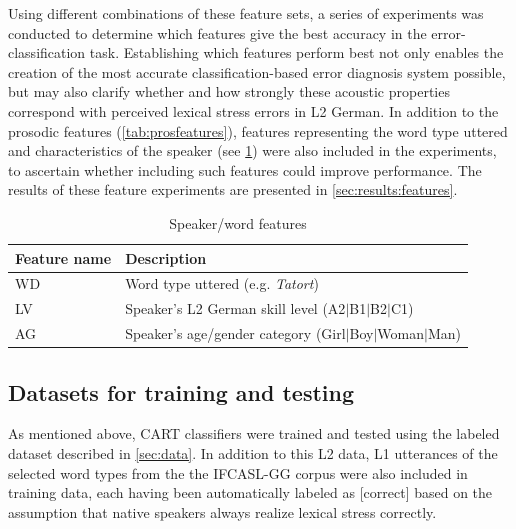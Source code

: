 \documentclass[a4paper]{article}
\begin{document}
		 Using different combinations of these feature sets, a series of experiments was conducted to determine which features give the best accuracy in the error-classification task. Establishing which features perform best not only enables the creation of the most accurate classification-based error diagnosis system possible, but may also clarify whether and how strongly these acoustic properties correspond with perceived lexical stress errors in L2 German.
		 In addition to the prosodic features (\cref{tab:prosfeatures}), features representing the word type uttered and characteristics of the speaker (see \cref{tab:spkrfeatures}) were also included in the experiments, to ascertain whether including such features could improve performance.
		The results of these feature experiments are presented in \cref{sec:results:features}.
		
		\begin{table}
			\centering
			\caption{Speaker/word features}
			\begin{tabularx}{\columnwidth}{lX}
			\toprule
			Feature name & Description \\
			\midrule
			WD %
				& Word type uttered (e.g. \textit{Tatort}) \\
			LV %
				& Speaker's L2 German skill level \newline (A2$|$B1$|$B2$|$C1)\\
			AG %
				& Speaker's age/gender category \newline (Girl$|$Boy$|$Woman$|$Man)\\
			\bottomrule
			\end{tabularx}
			\label{tab:spkrfeatures}		
		\end{table}
	    
	    
	    \subsection{Datasets for training and testing}
	    \label{sec:method:datasets}

		As mentioned above, CART classifiers were trained and tested using the labeled dataset described in \cref{sec:data}. In addition to this L2 data, L1 utterances of the selected word types from the the IFCASL-GG corpus were also included in training data, each having been automatically labeled as [correct] based on the assumption that native speakers always realize lexical stress correctly.
\end{document}

